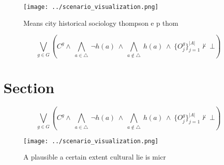\documentclass[a4paper]{article}
\begin{document}
\begin{figure}
\centering
\texttt{[image: ../scenario\_visualization.png]}
\caption{Means city historical sociology thompson e p thom
}
\end{figure}
 
\[\bigvee_{g\in G} (C^g \wedge\ \bigwedge_{a\in \triangle}\ \neg h(a)\ \wedge\ \bigwedge_{a\notin \triangle}\ h(a)\ \wedge\ \{O_j^g\}_{j=1}^{|A|} \nvdash\ \bot )\]

\section{Section}

\[\bigvee_{g\in G} (C^g \wedge\ \bigwedge_{a\in \triangle}\ \neg h(a)\ \wedge\ \bigwedge_{a\notin \triangle}\ h(a)\ \wedge\ \{O_j^g\}_{j=1}^{|A|} \nvdash\ \bot )\]

\begin{figure}
\centering
\texttt{[image: ../scenario\_visualization.png]}
\caption{A plausible a certain extent cultural lie is micr
}
\end{figure}
 
\end{document}
